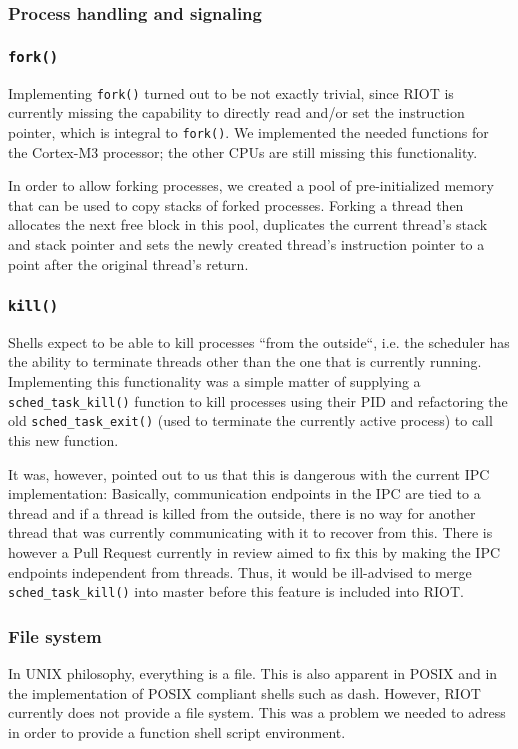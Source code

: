 \documentclass[conference]{IEEEtran}
\begin{document}
\subsubsection{Process handling and signaling}
\label{ssub:Process handling and signaling}
\subsubsection{\texttt{fork()}}
\label{ssub:fork}
Implementing \texttt{fork()} turned out to be not exactly trivial, since
RIOT is currently missing the capability to directly read and/or set the
instruction pointer, which is integral to \texttt{fork()}. We
implemented the needed functions for the Cortex-M3 processor; the other
CPUs are still missing this functionality.

In order to allow forking processes, we created a pool of
pre-initialized memory that can be used to copy stacks of forked
processes. Forking a thread then allocates the next free block in this
pool, duplicates the current thread's stack and stack pointer and sets
the newly created thread's instruction pointer to a point after the
original thread's return.

\subsubsection{\texttt{kill()}}
\label{ssub:kill}
Shells expect to be able to kill processes ``from the outside``, i.e.
the scheduler has the ability to terminate threads other than the one
that is currently running. Implementing this functionality was a simple
matter of supplying a \texttt{sched\_task\_kill()} function to kill
processes using their PID and refactoring the old
\texttt{sched\_task\_exit()} (used to terminate the currently active
process) to call this new function.

It was, however, pointed out to us\cite{1245} that this is dangerous
with the current IPC implementation: Basically, communication endpoints
in the IPC are tied to a thread and if a thread is killed from the
outside, there is no way for another thread that was currently
communicating with it to recover from this. There is however a Pull
Request\cite{1270} currently in review aimed to fix this by making the
IPC endpoints independent from threads. Thus, it would be ill-advised to
merge \texttt{sched\_task\_kill()} into master before this feature is
included into RIOT.

\subsubsection{File system}
\label{ssub:File system}
In UNIX philosophy, everything is a file. This is also apparent in POSIX
and in the implementation of POSIX compliant shells such as dash.
However, RIOT currently does not provide a file system. This was
a problem we needed to adress in order to provide a function shell
script environment.
\end{document}
